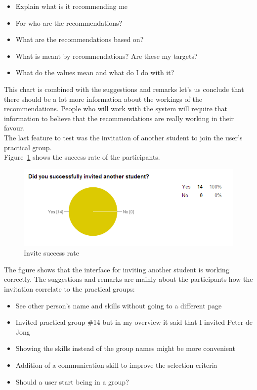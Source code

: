 \begin{itemize}
\item Explain what is it recommending me
\item For who are the recommendations?
\item What are the recommendations based on?
\item What is meant by recommendations? Are these my targets?
\item What do the values mean and what do I do with it?
\end{itemize}
This chart is combined with the suggestions and remarks let's us conclude that there should be a lot more information about the workings of the recommendations.
People who will work with the system will require that information to believe that the recommendations are really working in their favour.\\

The last feature to test was the invitation of another student to join the user's practical group.\\
Figure~\ref{invite_chart} shows the success rate of the participants.
\begin{figure}[H]
    \centering
    \includegraphics[width=\textwidth]{images/invite_chart}
    \caption{Invite success rate}
    \label{invite_chart}
\end{figure}

The figure shows that the interface for inviting another student is working correctly.
The suggestions and remarks are mainly about the participants how the invitation correlate to the practical groups:
\begin{itemize}
\item See other person's name and skills without going to a different page
\item Invited practical group $\#$14 but in my overview it said that I invited Peter de Jong
\item Showing the skills instead of the group names might be more convenient
\item Addition of a communication skill to improve the selection criteria
\item Should a user start being in a group?
\end{itemize}

